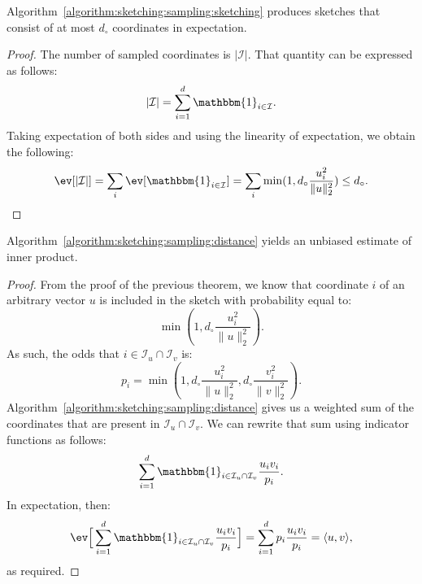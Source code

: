 \begin{theorem}
    Algorithm~\ref{algorithm:sketching:sampling:sketching} produces sketches
    that consist of at most $d_\circ$ coordinates in expectation.
\end{theorem}
\begin{proof}
    The number of sampled coordinates is $\lvert \mathcal{I} \rvert$.
    That quantity can be expressed as follows:
    \begin{equation*}
        \lvert \mathcal{I} \rvert = \sum_{i = 1}^d \mathbbm{1}_{i \in \mathcal{I}}.
    \end{equation*}
    Taking expectation of both sides and using the linearity of expectation,
    we obtain the following:
    \begin{equation*}
        \ev[\lvert \mathcal{I} \rvert] = \sum_i \ev[\mathbbm{1}_{i \in \mathcal{I}}]
        = \sum_i \min(1, d_\circ \frac{u_i^2}{\lVert u \rVert_2^2}) \leq d_\circ.
    \end{equation*}
\end{proof}

\begin{theorem}
    Algorithm~\ref{algorithm:sketching:sampling:distance} yields an unbiased estimate
    of inner product.
\end{theorem}
\begin{proof}
    From the proof of the previous theorem, we know that coordinate $i$ of an arbitrary
    vector $u$ is included in the sketch with probability equal to:
    \begin{equation*}
        \min(1, d_\circ \frac{u_i^2}{\lVert u \rVert_2^2}).
    \end{equation*}
    As such, the odds that $i \in \mathcal{I}_u \cap \mathcal{I}_v$ is:
    \begin{equation*}
        p_i = \min(1, d_\circ \frac{u_i^2}{\lVert u \rVert_2^2}, d_\circ \frac{v_i^2}{\lVert v \rVert_2^2}).
    \end{equation*}
    Algorithm~\ref{algorithm:sketching:sampling:distance} gives us a weighted sum of
    the coordinates that are present in $\mathcal{I}_u \cap \mathcal{I}_v$. We can rewrite that
    sum using indicator functions as follows:
    \begin{equation*}
        \sum_{i = 1}^d \mathbbm{1}_{i \in \mathcal{I}_u \cap \mathcal{I}_v} \frac{u_i v_i}{p_i}.
    \end{equation*}
    In expectation, then:
    \begin{equation*}
        \ev\Big[\sum_{i = 1}^d \mathbbm{1}_{i \in \mathcal{I}_u \cap \mathcal{I}_v} \frac{u_i v_i}{p_i}\Big]
        = \sum_{i = 1}^d p_i \frac{u_i v_i}{p_i} = \langle u, v \rangle,
    \end{equation*}
    as required.
\end{proof}

